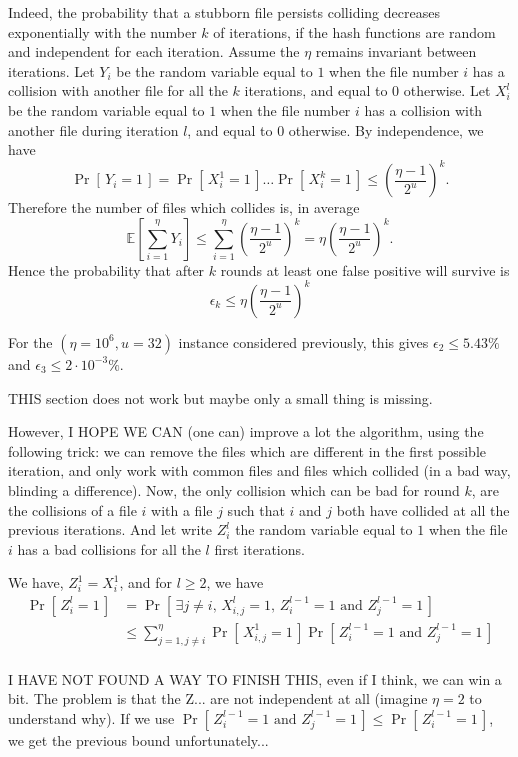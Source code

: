\documentclass[11pt]{llncs}
\newcommand{\Prob}[1]{{\Pr\left[\,{#1}\,\right]}}
\newcommand{\EE}[1]{{\mathbb{E}\left[{#1}\right]}}
\begin{document}
Indeed, the probability that a stubborn file persists colliding decreases exponentially with the number $k$ of iterations, if the hash functions are random and independent for each iteration.
Assume the $\eta$ remains invariant between iterations.
Let $Y_i$ be the random variable equal to $1$ when the file number $i$ has a collision with another file for all the $k$ iterations, and equal to $0$ otherwise.
Let $X^l_i$ be the random variable equal to $1$ when the file number $i$ has a collision with another file during iteration $l$, and equal to $0$ otherwise.
By independence, we have
 \[ \Prob{Y_i = 1} = \Prob{X^1_i = 1} \dots \Prob{X^k_i = 1} \le \left( \frac{\eta -1}{2^u} \right)^k. \] 
Therefore the number of files which collides is, in average
\[
 \EE{\sum_{i=1}^{\eta} Y_i} \le \sum_{i=1}^\eta \left( \frac{\eta -1}{2^u} \right)^k =  \eta \left(\frac{\eta - 1}{2^u}\right)^k.
\]
Hence the probability that after $k$ rounds at least one false positive will survive is
\[
\epsilon_k \le \eta \left(\frac{\eta - 1}{2^u}\right)^k
\]

For the $(\eta=10^6,u=32)$ instance considered previously, this gives $\epsilon_2 \le 5.43\%$ and $\epsilon_3 \le 2 \cdot 10^{-3} \%$.

THIS section does not work but maybe only a small thing is missing.

However, I HOPE WE CAN (one can) improve a lot the algorithm, using the following trick: we can remove the files which are different in the first possible iteration, and only work with common files and files which collided (in a bad way, blinding a difference).
Now, the only collision which can be bad for round $k$, are the collisions of a file $i$ with a file $j$ such that $i$ and $j$ both have collided at all the previous iterations.
And let write $Z^l_i$ the random variable equal to $1$ when the file $i$ has a bad collisions for all the $l$ first iterations.

We have, $Z^1_i = X^1_i$, and for $l \ge 2$, we have
\begin{align*} 
\Prob{Z^l_i=1} &= \Prob{\exists j\neq i \text{, } X^l_{i,j} = 1 \text{, } Z^{l-1}_{i} = 1  \text{ and } Z^{l-1}_{j} = 1}  \\ 
&\le \sum_{j=1, j\neq i}^\eta \Prob{X^1_{i,j} = 1} \Prob{Z^{l-1}_{i} = 1 \text{ and } Z^{l-1}_{j} = 1}  \\ 
\end{align*}

I HAVE NOT FOUND A WAY TO FINISH THIS, even if I think, we can win a bit.
The problem is that the Z... are not independent at all (imagine $\eta = 2$ to understand why).
If we use $\Prob{Z^{l-1}_{i} = 1 \text{ and } Z^{l-1}_{j} = 1} \le \Prob{Z^{l-1}_{i} = 1}$, we get the previous bound unfortunately...
\end{document}
